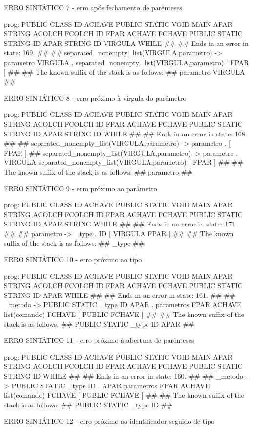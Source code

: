 \documentclass[12pt,a4paper,twoside]{report}
\begin{document}
\begin{terminal}
ERRO SINTÁTICO 7 -  erro após fechamento de parênteses

prog: PUBLIC CLASS ID ACHAVE PUBLIC STATIC VOID MAIN APAR STRING ACOLCH FCOLCH ID FPAR ACHAVE FCHAVE PUBLIC STATIC STRING ID APAR STRING ID VIRGULA WHILE 
##
## Ends in an error in state: 169.
##
## separated_nonempty_list(VIRGULA,parametro) -> parametro VIRGULA . separated_nonempty_list(VIRGULA,parametro) [ FPAR ]
##
## The known suffix of the stack is as follows:
## parametro VIRGULA 
##

ERRO SINTÁTICO 8 -  erro próximo à vírgula do parâmetro

prog: PUBLIC CLASS ID ACHAVE PUBLIC STATIC VOID MAIN APAR STRING ACOLCH FCOLCH ID FPAR ACHAVE FCHAVE PUBLIC STATIC STRING ID APAR STRING ID WHILE 
##
## Ends in an error in state: 168.
##
## separated_nonempty_list(VIRGULA,parametro) -> parametro . [ FPAR ]
## separated_nonempty_list(VIRGULA,parametro) -> parametro . VIRGULA separated_nonempty_list(VIRGULA,parametro) [ FPAR ]
##
## The known suffix of the stack is as follows:
## parametro 
##

ERRO SINTÁTICO 9 -  erro próximo ao parâmetro

prog: PUBLIC CLASS ID ACHAVE PUBLIC STATIC VOID MAIN APAR STRING ACOLCH FCOLCH ID FPAR ACHAVE FCHAVE PUBLIC STATIC STRING ID APAR STRING WHILE 
##
## Ends in an error in state: 171.
##
## parametro -> _type . ID [ VIRGULA FPAR ]
##
## The known suffix of the stack is as follows:
## _type 
##

ERRO SINTÁTICO 10 -  erro próximo ao tipo

prog: PUBLIC CLASS ID ACHAVE PUBLIC STATIC VOID MAIN APAR STRING ACOLCH FCOLCH ID FPAR ACHAVE FCHAVE PUBLIC STATIC STRING ID APAR WHILE 
##
## Ends in an error in state: 161.
##
## _metodo -> PUBLIC STATIC _type ID APAR . parametros FPAR ACHAVE list(comando) FCHAVE [ PUBLIC FCHAVE ]
##
## The known suffix of the stack is as follows:
## PUBLIC STATIC _type ID APAR 
##

ERRO SINTÁTICO 11 -  erro próximo à abertura de parênteses

prog: PUBLIC CLASS ID ACHAVE PUBLIC STATIC VOID MAIN APAR STRING ACOLCH FCOLCH ID FPAR ACHAVE FCHAVE PUBLIC STATIC STRING ID WHILE 
##
## Ends in an error in state: 160.
##
## _metodo -> PUBLIC STATIC _type ID . APAR parametros FPAR ACHAVE list(comando) FCHAVE [ PUBLIC FCHAVE ]
##
## The known suffix of the stack is as follows:
## PUBLIC STATIC _type ID 
##

ERRO SINTÁTICO 12 -  erro próximo ao identificador seguido de tipo


\end{terminal}
\end{document}
